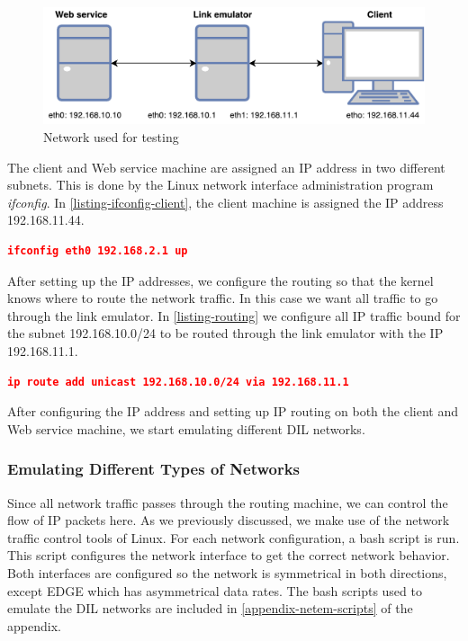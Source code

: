 \begin{figure}[h]
\includegraphics[scale=0.73]{images/testing_environment.pdf}
\caption{Network used for testing}
\label{figure-testing-environment}
\end{figure}

The client and Web service machine are assigned an IP address in two different
subnets. This is done by the Linux network interface administration program
\textit{ifconfig}. In \cref{listing-ifconfig-client}, the client machine is
assigned the IP address 192.168.11.44.

\begin{lstlisting}[frame=single, language=json, caption="Setting the IP address a network interface", label=listing-ifconfig-client]
ifconfig eth0 192.168.2.1 up
\end{lstlisting}

After setting up the IP addresses, we configure the routing so that the kernel
knows where to route the network traffic. In this case we want all traffic to go
through the link emulator. In \cref{listing-routing} we configure all IP traffic
bound for the subnet 192.168.10.0/24 to be routed through the link emulator with
the IP 192.168.11.1.

\begin{lstlisting}[frame=single, language=json, caption="Configuring routing rules", label=listing-routing]
ip route add unicast 192.168.10.0/24 via 192.168.11.1
\end{lstlisting}

After configuring the IP address and setting up IP routing on both the client
and Web service machine, we start emulating different DIL networks.

\subsubsection{Emulating Different Types of Networks}

Since all network traffic passes through the routing machine, we can control the
flow of IP packets here. As we previously discussed, we make use of the network
traffic control tools of Linux. For each network configuration, a bash script is
run. This script configures the network interface to get the correct network
behavior. Both interfaces are configured so the network is symmetrical in both
directions, except EDGE which has asymmetrical data rates. The bash scripts used
to emulate the DIL networks are included in \cref{appendix-netem-scripts} of the
appendix.


